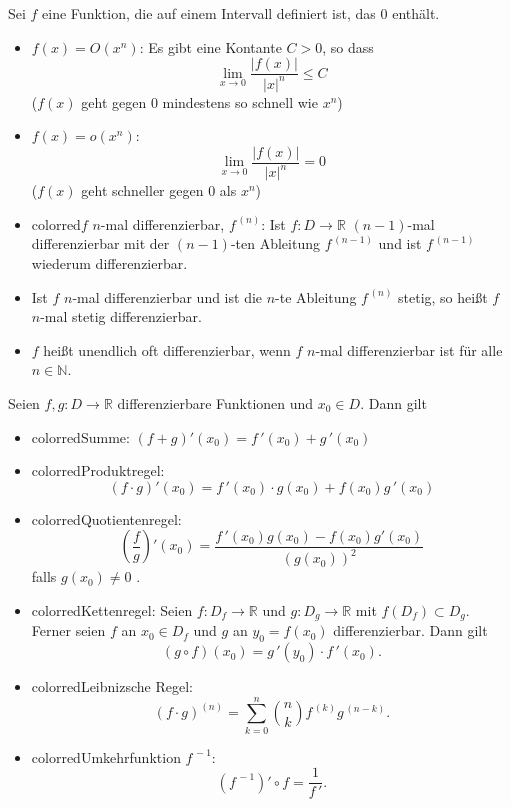 \documentclass[a4paper,12pt,DIV15]{scrartcl}
\begin{document}
\begin{defn}
Sei $f$ eine Funktion, die auf einem Intervall definiert ist, das $0$
enthält. 
\begin{itemize}
 \item {\color{red} $f(x)=O(x^n)$}: Es gibt eine Kontante $C >0$, so dass
\[  \lim_{x \rightarrow 0} \frac{|f(x)|}{|x|^n} \leq C\]
($f(x)$ geht gegen $0$ mindestens so schnell wie $x^n$)
\item {\color{red} $f(x)=o(x^n)$}: 
\[  
 \lim_{x \rightarrow 0} \frac{|f(x)|}{|x|^n}=0
\]
($f(x)$ geht schneller gegen $0$ als $x^n$)
\end{itemize}
\end{defn}


\begin{defn}
\begin{itemize}
\item {color{red}$f$ $n$-mal differenzierbar, $f^{\,(n)}$}: Ist $f:D
\rightarrow \mathbb{R}$ $(n-1)$-mal differenzierbar mit der
$(n-1)$-ten Ableitung $f^{\,(n-1)}$ und ist $f^{\,(n-1)}$ wiederum
differenzierbar.
\item Ist $f$ $n$-mal differenzierbar und ist die $n$-te Ableitung $f^{\,(n)}$
stetig, so heißt $f$ $n$-mal {\color{red} stetig differenzierbar}.
\item $f$ heißt {\color{red} unendlich oft differenzierbar}, wenn $f$ $n$-mal
differenzierbar ist für alle $n\in \mathbb{N}$. 
\end{itemize}
\end{defn}




\begin{thm}[Differentationsregeln]
Seien $f,g:D \rightarrow \mathbb{R}$ differenzierbare Funktionen und
$x_0 \in D$. Dann gilt
\begin{itemize}
\item {color{red}Summe}: $(f+g)'(x_0)=f\,'(x_0)+ g\,'(x_0)$
\item {color{red}Produktregel}: \[(f \cdot g)'(x_0) = f\,'(x_0) \cdot g(x_0) + f(x_0)g\,'(x_0)\] 
\item {color{red}Quotientenregel}: \[\left(\frac{f}{g}\right)'(x_0) = \frac{f\,'(x_0) g(x_0) - f(x_0)
g'(x_0)}{(g(x_0))^2}\]
falls $g(x_0) \neq 0$ .
\item {color{red}Kettenregel}: Seien $f:D_f \rightarrow \mathbb{R}$ und $g:D_g
\rightarrow \mathbb{R}$ mit $f(D_f) \subset D_g$. Ferner seien $f$ an
$x_0 \in D_f$ und $g$ an $y_0=f(x_0)$ differenzierbar. Dann gilt
\[ (g \circ f)(x_0) = g\,'(y_0) \cdot f\,'(x_0).  \]
\item {color{red}Leibnizsche Regel}:
\[
(f \cdot g)^{(n)} = \sum_{k=0}^n \binom{n}{k} f^{\,(k)} g^{\,(n-k)}.
\]
\item {color{red}Umkehrfunktion $f^{\,-1}$}:
\[(f^{\,-1})' \circ f = \frac{1}{f\,'}.\]
\end{itemize}
\end{thm}
\end{document}
